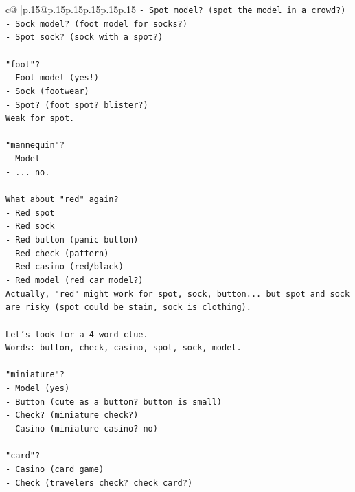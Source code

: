 \documentclass{article}
\begin{document}
{\begin{supertabular}{c@{$\;$}|p{.15\linewidth}@{}p{.15\linewidth}p{.15\linewidth}p{.15\linewidth}p{.15\linewidth}p{.15\linewidth}}
{{{\texttt{{-} Spot model? (spot the model in a crowd?)} \\
\texttt{{-} Sock model? (foot model for socks?)} \\
\texttt{{-} Spot sock? (sock with a spot?)} \\
\\ 
\texttt{"foot"?} \\
\texttt{{-} Foot model (yes!)} \\
\texttt{{-} Sock (footwear)} \\
\texttt{{-} Spot? (foot spot? blister?)} \\
\texttt{Weak for spot.} \\
\\ 
\texttt{"mannequin"?} \\
\texttt{{-} Model} \\
\texttt{{-} ... no.} \\
\\ 
\texttt{What about "red" again?} \\
\texttt{{-} Red spot} \\
\texttt{{-} Red sock} \\
\texttt{{-} Red button (panic button)} \\
\texttt{{-} Red check (pattern)} \\
\texttt{{-} Red casino (red/black)} \\
\texttt{{-} Red model (red car model?)} \\
\texttt{Actually, "red" might work for spot, sock, button... but spot and sock are risky (spot could be stain, sock is clothing).} \\
\\ 
\texttt{Let's look for a 4{-}word clue.} \\
\texttt{Words: button, check, casino, spot, sock, model.} \\
\\ 
\texttt{"miniature"?} \\
\texttt{{-} Model (yes)} \\
\texttt{{-} Button (cute as a button? button is small)} \\
\texttt{{-} Check? (miniature check?)} \\
\texttt{{-} Casino (miniature casino? no)} \\
\\ 
\texttt{"card"?} \\
\texttt{{-} Casino (card game)} \\
\texttt{{-} Check (travelers check? check card?)} \\
}}}
\end{supertabular}}
\end{document}
